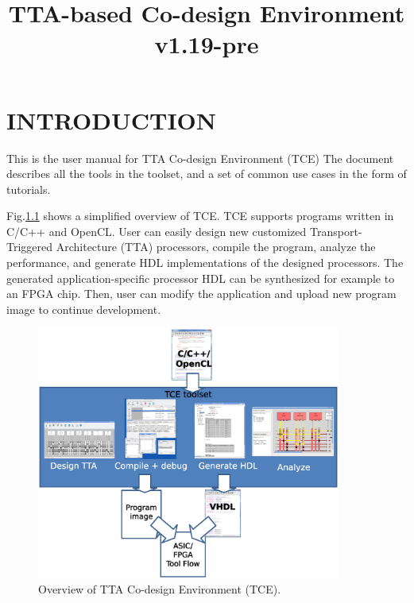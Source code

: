 \documentclass[twoside]{tceusermanual}
\begin{document}
\title{TTA-based Co-design Environment v1.19-pre}
\maketitle

\tableofcontents

\chapter{INTRODUCTION}

This is the user manual for TTA Co-design Environment (TCE)
\cite{tcewww}
The document describes all the tools in the toolset, and a set of common use
cases in the form of tutorials.

Fig.\ref{fig:tce_overview} shows a simplified overview of TCE. TCE supports
programs written in C/C++ and OpenCL. User can easily design new customized
Transport-Triggered Architecture (TTA) processors, compile the program,
analyze the performance, and generate HDL implementations of the designed
processors. The generated application-specific processor HDL can be
synthesized for example to an FPGA chip. Then, user can modify the
application and upload new program image to continue development.

\begin{figure}
  \begin{center}
    \includegraphics[width=10cm]{eps/tce_overview}
    \caption{Overview of TTA Co-design Environment (TCE).}
    \label{fig:tce_overview}
  \end{center}
\end{figure}
\end{document}
